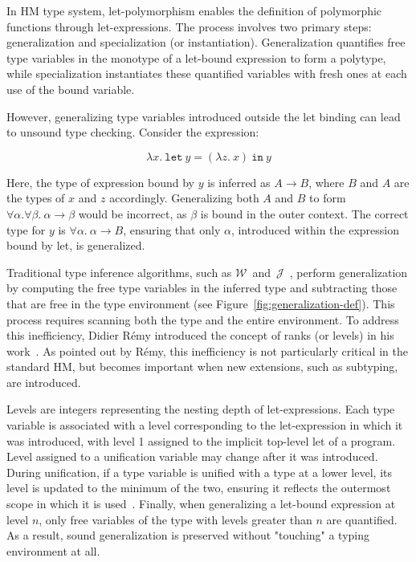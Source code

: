 In HM type system, let-polymorphism enables the definition of polymorphic functions through let-expressions. The process involves two primary steps: generalization and specialization (or instantiation). Generalization quantifies free type variables in the monotype of a let-bound expression to form a polytype, while specialization instantiates these quantified variables with fresh ones at each use of the bound variable.

However, generalizing type variables introduced outside the let binding can lead to unsound type checking. Consider the expression:

$$
\lambda x.\ \texttt{let}\ y = (\lambda z.\ x)\ \texttt{in}\ y
$$

Here, the type of expression bound by $y$ is inferred as $A \to B$, where $B$ and $A$ are the types of $x$ and $z$ accordingly. Generalizing both $A$ and $B$ to form $\forall \alpha. \forall \beta.\ \alpha \to \beta$ would be incorrect, as $\beta$ is bound in the outer context. The correct type for $y$ is $\forall \alpha.\ \alpha \to B$, ensuring that only $\alpha$, introduced within the expression bound by let, is generalized.

Traditional type inference algorithms, such as $\mathcal{W}$~and~$\mathcal{J}$~\cite{Milner1978_TypePolymorphism}, perform generalization by computing the free type variables in the inferred type and subtracting those that are free in the type environment (see Figure~\ref{fig:generalization-def}). This process requires scanning both the type and the entire environment. To address this inefficiency, Didier R\'emy introduced the concept of ranks (or levels) in his work~\cite{Remy1992_SortedEqTheoryTypes}. As pointed out by R\'emy, this inefficiency is not particularly critical in the standard HM, but becomes important when new extensions, such as subtyping, are introduced.

Levels are integers representing the nesting depth of let-expressions. Each type variable is associated with a level corresponding to the let-expression in which it was introduced, with level 1 assigned to the implicit top-level let of a program. Level assigned to a unification variable may change after it was introduced. During unification, if a type variable is unified with a type at a lower level, its level is updated to the minimum of the two, ensuring it reflects the outermost scope in which it is used~\cite{Kiselyov2022_OCamplTypeChecker}. Finally, when generalizing a let-bound expression at level $n$, only free variables of the type with levels greater than $n$ are quantified. As a result, sound generalization is preserved without "touching" a typing environment at all.

